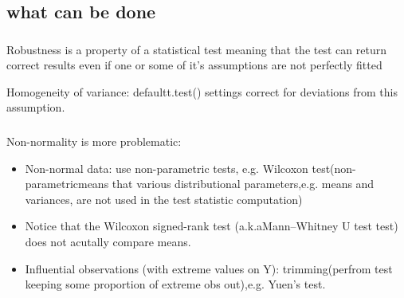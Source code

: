 \documentclass[t, 11pt]{beamer}
\begin{document}
	\subsection{what can be done}
	\begin{frame}
	\frametitle{\insertsection} 
	\framesubtitle{\insertsubsection} 
	
	Robustness is a property of a statistical test meaning that the test can return correct results even if one or some of it's assumptions are not perfectly fitted
	
	\vspace{0.3cm}
	
	Homogeneity of variance: defaultt.test() settings correct for deviations from this assumption.
	
	\vspace{0.3cm}
\end{frame}	
	\begin{frame}
	\frametitle{\insertsection} 
	\framesubtitle{\insertsubsection} 

	Non-normality is more problematic:
	
	\begin{itemize}
		\item Non-normal data: use non-parametric tests, e.g. Wilcoxon test(non-parametricmeans that various distributional parameters,e.g. means and variances, are not used in the test statistic computation)
		
		\item Notice that the Wilcoxon signed-rank test (a.k.aMann–Whitney U test test) does not acutally compare means.
		
		\item Influential observations (with extreme values on Y): trimming(perfrom test keeping some proportion of extreme obs out),e.g. Yuen’s test.
		
	\end{itemize}

\end{frame}	
\end{document}
